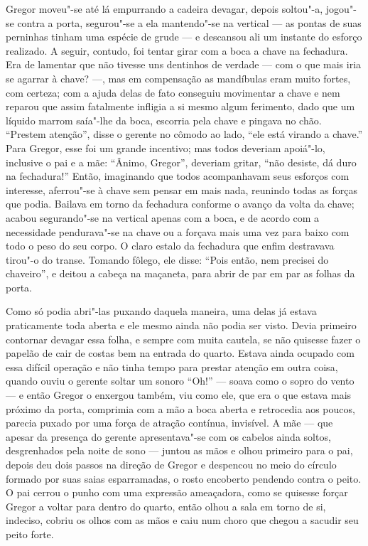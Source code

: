 Gregor moveu"-se até lá empurrando a cadeira devagar, depois soltou"-a,
jogou"-se contra a porta, segurou"-se a ela mantendo"-se na vertical --- as
pontas de suas perninhas tinham uma espécie de grude --- e descansou ali um
instante do esforço realizado. A seguir, contudo, foi tentar girar com a
boca a chave na fechadura. Era de lamentar que não tivesse uns dentinhos
de verdade --- com o que mais iria se agarrar à chave? ---, mas em compensação
as mandíbulas eram muito fortes, com certeza; com a ajuda delas de fato
conseguiu movimentar a chave e nem reparou que assim fatalmente infligia a
si mesmo algum ferimento, dado que um líquido marrom saía"-lhe da boca,
escorria pela chave e pingava no chão. “Prestem atenção”, disse o gerente
no cômodo ao lado, “ele está virando a chave.” Para Gregor, esse foi um
grande incentivo; mas todos deveriam apoiá"-lo, inclusive o pai e a mãe:
“Ânimo, Gregor”, deveriam gritar, “não desiste, dá duro na fechadura!”
Então, imaginando que todos acompanhavam seus esforços com interesse,
aferrou"-se à chave sem pensar em mais nada, reunindo todas as forças que
podia. Bailava em torno da fechadura conforme o avanço da volta da chave;
acabou segurando"-se na vertical apenas com a boca, e de acordo com a
necessidade pendurava"-se na chave ou a forçava mais uma vez para baixo com
todo o peso do seu corpo. O claro estalo da fechadura que enfim destravava
tirou"-o do transe. Tomando fôlego, ele disse: “Pois então, nem precisei do
chaveiro”, e deitou a cabeça na maçaneta, para abrir de par em par as
folhas da porta.

Como só podia abri"-las puxando daquela maneira, uma delas já estava
praticamente toda aberta e ele mesmo ainda não podia ser visto. Devia
primeiro contornar devagar essa folha, e sempre com muita cautela, se não
quisesse fazer o papelão de cair de costas bem na entrada do quarto.
Estava ainda ocupado com essa difícil operação e não tinha tempo para
prestar atenção em outra coisa, quando ouviu o gerente soltar um sonoro
“Oh!” --- soava como o sopro do vento --- e então Gregor o enxergou também,
viu como ele, que era o que estava mais próximo da porta, comprimia com a
mão a boca aberta e retrocedia aos poucos, parecia puxado por uma força de
atração contínua, invisível. A mãe --- que apesar da presença do gerente
apresentava"-se com os cabelos ainda soltos, desgrenhados pela noite de
sono --- juntou as mãos e olhou primeiro para o pai, depois deu dois passos
na direção de Gregor e despencou no meio do círculo formado por suas saias
esparramadas, o rosto encoberto pendendo contra o peito. O pai cerrou o
punho com uma expressão ameaçadora, como se quisesse forçar Gregor a
voltar para dentro do quarto, então olhou a sala em torno de si, indeciso,
cobriu os olhos com as mãos e caiu num choro que chegou a sacudir seu
peito forte.

